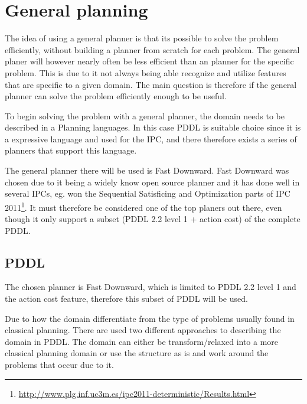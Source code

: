 \section{General planning}
	The idea of using a general planner is that its possible to solve the problem efficiently, without building a planner from scratch for each problem. The general planer will however nearly often be less efficient than an planner for the specific problem. This is due to it not always being able recognize and utilize features that are specific to a given domain. The main question is therefore if the general planner can solve the problem efficiently enough to be useful.

	To begin solving the problem with a general planner, the domain needs to be described in a Planning languages. In this case PDDL is suitable choice since it is a expressive language and used for the IPC, and there therefore exists a series of planners that support this language.
 
	  
	
	The general planner there will be used is Fast Downward. Fast Downward was chosen due to it being a widely know open source planner and it has done well in several IPCs, eg. won the Sequential Satisficing and Optimization parts of IPC 2011\footnote{\url{http://www.plg.inf.uc3m.es/ipc2011-deterministic/Results.html}}. It must therefore be considered one of the top planers out there, even though it only support a subset (PDDL 2.2 level 1 + action cost) of the complete PDDL.
 
 \subsection{PDDL}

	The chosen planner is Fast Downward, which is limited to PDDL 2.2 level 1 and the action cost feature, therefore this subset of PDDL will be used.

	Due to how the domain differentiate from the type of problems usually found in classical planning. There are used two different approaches to describing the domain in PDDL. The domain can either be transform/relaxed into a more classical planning domain or use the structure as is and work around the problems that occur due to it.
	
